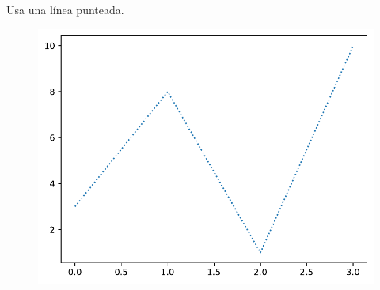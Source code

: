 \begin{code} Usa una línea punteada.

\begin{Shaded}
\begin{Highlighting}[]

\OperatorTok{=}\NormalTok{ np.array([}\NormalTok{, }\NormalTok{, }\NormalTok{, }\NormalTok{])}

\OperatorTok{=} \NormalTok{)}
\end{Highlighting}
\end{Shaded}

\begin{figure}
  \centering
  \includegraphics[scale=0.6]{img/grafica1016.pdf}
\end{figure}

\end{code}

